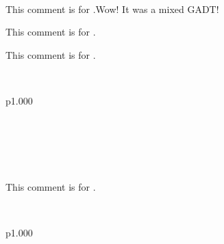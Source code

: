 \\
\begin{ocamlindent}This comment is for .Wow! It was a mixed GADT!\end{ocamlindent}%
\medbreak
\label{Ocamlary-type-alias}\begin{ocamlindent}This comment is for .\end{ocamlindent}%
\medbreak
\label{Ocamlary-type-tuple}\begin{ocamlindent}This comment is for .\end{ocamlindent}%
\medbreak
\label{Ocamlary-type-variant_alias}\\
\begin{ocamltabular}{p{1.000\textwidth}}\label{Ocamlary-type-variant_alias.TagA}\\
\label{Ocamlary-type-variant_alias.ConstrB}\\
\label{Ocamlary-type-variant_alias.ConstrC}\\
\label{Ocamlary-type-variant_alias.ConstrD}\\
\end{ocamltabular}%
\\
\begin{ocamlindent}This comment is for .\end{ocamlindent}%
\medbreak
\label{Ocamlary-type-record_alias}\\
\begin{ocamltabular}{p{1.000\textwidth}}\label{Ocamlary-type-record_alias.field1}\\
\label{Ocamlary-type-record_alias.field2}\\
\end{ocamltabular}%
